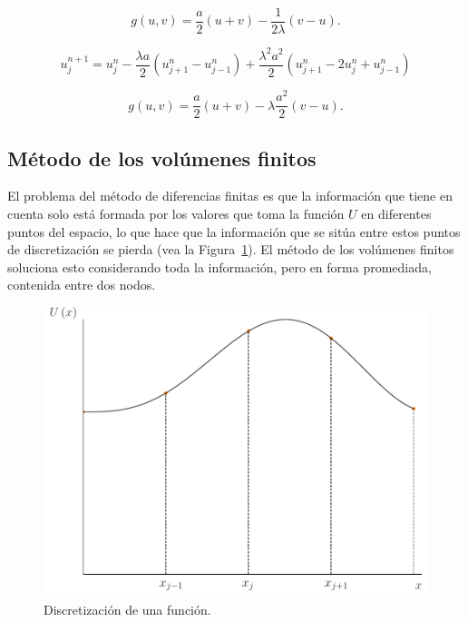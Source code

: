 \begin{equation*}
	g\left(u,v\right)=
	\frac{a}{2}\left(u+v\right)-
	\frac{1}{2\lambda}\left(v-u\right).
\end{equation*}

\begin{equation*}
	u^{n+1}_{j}=
	u^{n}_{j}-
	\frac{\lambda a}{2}
	\left(u^{n}_{j+1}-u^{n}_{j-1}\right)+
	\frac{\lambda^{2}a^{2}}{2}
	\left(u^{n}_{j+1}-2u^{n}_{j}+u^{n}_{j-1}\right)
\end{equation*}

\begin{equation*}
	g\left(u,v\right)=
	\frac{a}{2}\left(u+v\right)-
	\lambda\frac{a^{2}}{2}\left(v-u\right).
\end{equation*}

\subsection{Método de los volúmenes finitos}

El problema del método de diferencias finitas es que la información
que tiene en cuenta solo está formada por los valores que toma la
función $U$ en diferentes puntos del espacio, lo que hace que la
información que se sitúa entre estos puntos de discretización se
pierda (vea la Figura~\ref{fig:discretization}).
El método de los volúmenes finitos soluciona esto considerando toda
la información, pero en forma promediada, contenida entre dos nodos.

\begin{figure}[ht!]
	\centering
	\includegraphics[width=.45\paperwidth]{discretization}
	\caption{Discretización de una función.}
	\label{fig:discretization}
\end{figure}

